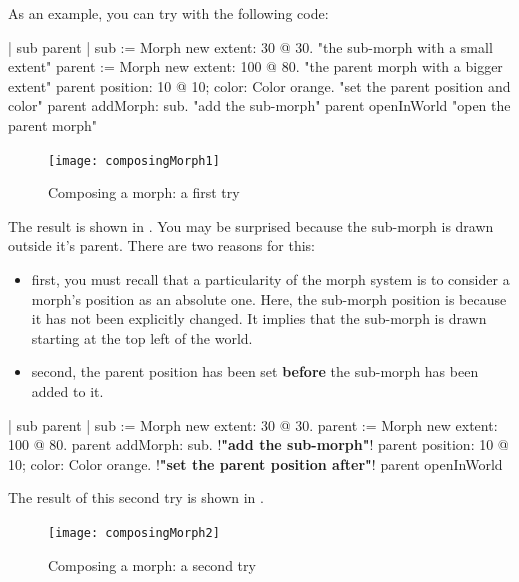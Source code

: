 \documentclass[a4paper,10pt,twoside]{book}
\begin{document}

As an example, you can try with the following code:

\begin{code}
| sub parent |
sub := Morph new extent: 30 @ 30. "the sub-morph with a small extent"
parent := Morph new extent: 100 @ 80. "the parent morph with a bigger extent"
parent position: 10 @ 10; color: Color orange. "set the parent position and color"
parent addMorph: sub. "add the sub-morph"
parent openInWorld "open the parent morph"
\end{code}

\begin{figure}[htbp]
\begin{center}
	\texttt{[image: composingMorph1]}
	\caption{Composing a morph: a first try}
\end{center}
\end{figure}

The result is shown in . You may be surprised because the sub-morph is drawn outside it's parent. There are two reasons for this:
\begin{itemize}
\item first, you must recall that a particularity of the morph system is to consider a morph's position as an absolute one. Here, the sub-morph position is  because it has not been explicitly changed. It implies that the sub-morph is drawn starting at the top left of the world.
\item second, the parent position has been set \textbf{before} the sub-morph has been added to it.
\end{itemize}


\begin{code}
| sub parent |
sub := Morph new extent: 30 @ 30. 
parent := Morph new extent: 100 @ 80. 
parent addMorph: sub. !\textbf{"add the sub-morph"}!
parent position: 10 @ 10; color: Color orange. !\textbf{"set the parent position after"}!
parent openInWorld 
\end{code}
The result of this second try is shown in .
\begin{figure}[htbp]
\begin{center}
	\texttt{[image: composingMorph2]}
	\caption{Composing a morph: a second try}
\end{center}
\end{figure}
\end{document}
